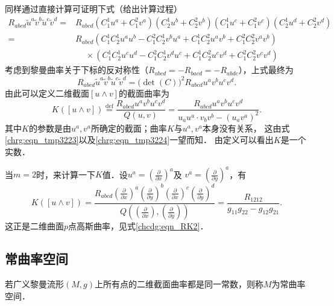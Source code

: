 同样通过直接计算可证明下式（给出计算过程）
\begin{align*}
    R_{abcd}\tilde{u}^a\tilde{v}^b\tilde{u}^c\tilde{v}^d = & R_{abcd}
    (C_1^1 u^a +C_1^2 v^a) (C_2^1 u^b +C_2^2 v^b)(C_1^1 u^c +C_1^2 v^c) (C_2^1 u^d +C_2^2 v^d) \\
    =&R_{abcd}(C_1^1 C_2^1 u^a u^b -C_1^2 C_2^1 v^b u^a+ C_1^1 C_2^2 u^a v^b +C_1^2 C_2^2 v^a v^b) \\
    &\phantom{R_{a}}\times (C_1^1 C_2^1 u^c u^d -C_1^2 C_2^1 v^d u^c+ C_1^1 C_2^2 u^c v^d +C_1^2 C_2^2 v^c v^d)
\end{align*}
考虑到黎曼曲率关于下标的反对称性（$R_{abcd}=-R_{bacd}=-R_{abdc}$），上式最终为
\begin{equation}\label{chrg:eqn_tmp3224}
    R_{abcd}\tilde{u}^a\tilde{v}^b\tilde{u}^c\tilde{v}^d = \bigl(\det(C)\bigr)^2 R_{abcd} u^a v^b u^c v^d .
\end{equation}
由此可以定义二维截面$[u\wedge v]$的{\heiti 截面曲率}为
\begin{equation}\label{chrg:eqn_sectional-curvature}
    K([u\wedge v]) \overset{\mathrm {def}}{=}  \frac{R_{abcd} u^a v^b u^c v^d}{Q(u,v)} 
    = \frac{R_{abcd} u^a v^b u^c v^d}{{u}_a{u}^a \cdot {v}_b{v}^b - ({u}_a{v}^a)^2 } .
\end{equation}
其中$K$的参数是由$u^a,v^a$所确定的截面；曲率$K$与$u^a,v^a$本身没有关系，
这由式\eqref{chrg:eqn_tmp3223}以及\eqref{chrg:eqn_tmp3224}一望而知．
由定义可以看出$K$是一个实数．

\begin{example}\label{chrg:exam_sc-gauss}
    当$m=2$时，来计算一下$K$值．设$u^a=(\frac{\partial}{\partial x})^a$及
    $v^a=(\frac{\partial}{\partial y})^a$，有
    \begin{equation}
        K([u\wedge v]) = \frac{R_{abcd} (\frac{\partial}{\partial x})^a (\frac{\partial}{\partial y})^b
            (\frac{\partial}{\partial x})^c (\frac{\partial}{\partial y})^d}
          {Q((\frac{\partial}{\partial x}),(\frac{\partial}{\partial y}))}
        =\frac{R_{1212}}{g_{11}g_{22}-g_{12}g_{21}} .
    \end{equation}
    这正是二维曲面$p$点高斯曲率，见式\eqref{chcdg:eqn_RK2}．
\end{example}


\subsection{常曲率空间}\label{chrg:sec_const-curvature}
\begin{definition}
        若广义黎曼流形$(M,g)$上所有点的二维截面曲率都是同一常数，则称$M$为{\heiti 常曲率空间}．
\end{definition}

